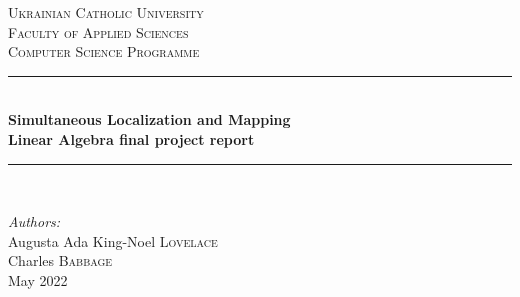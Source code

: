 \begin{titlepage}

\newcommand{\HRule}{\rule{\linewidth}{0.5mm}} %

\center %
 

\textsc{\LARGE Ukrainian Catholic University}\\[1cm] %
\textsc{\Large  Faculty of Applied Sciences}\\[0.5cm] %
\textsc{\large Computer Science Programme}\\[0.5cm] %

\vspace*{1cm}

\HRule \\[0.4cm]
{ \huge \bfseries Simultaneous Localization and Mapping }\\[10pt]
{\Large \bfseries Linear Algebra final project report}\\[0.4cm] %
\HRule \\[1cm]
 
\vspace*{1cm}

\Large \emph{Authors:}\\
Augusta Ada King-Noel \textsc{Lovelace}\\Charles \textsc{Babbage}\\[1cm] %

\vspace*{1cm}
{\large May 2022 }\\[2cm] %


\end{titlepage}
